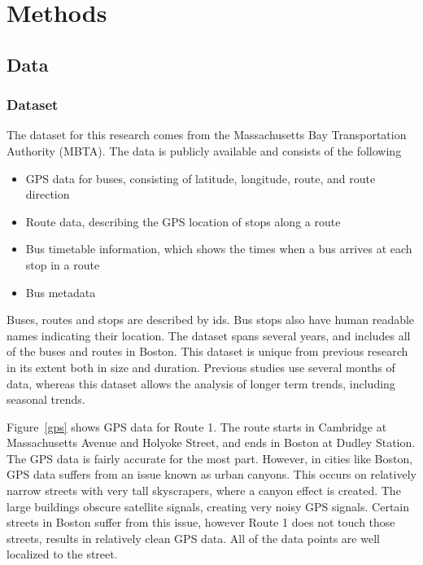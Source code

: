 \chapter{Methods}
\section{Data}\label{data}

\subsection{Dataset}

The dataset for this research comes from the Massachusetts Bay Transportation Authority (MBTA).  The data is publicly available and consists of the following

\begin{itemize}
  \item GPS data for buses, consisting of latitude, longitude, route, and route direction
  \item Route data, describing the GPS location of stops along a route
  \item Bus timetable information, which shows the times when a bus arrives at each stop in a route
  \item Bus metadata
\end{itemize}

Buses, routes and stops are described by ids.  Bus stops also have human readable names indicating their location.
The dataset spans several years, and includes all of the buses and routes in Boston.
This dataset is unique from previous research in its extent both in size and duration.
Previous studies use several months of data, whereas this dataset allows the analysis of longer term trends, including seasonal trends.

Figure~\ref{gps} shows GPS data for Route 1.  The route starts in Cambridge at Massachusetts Avenue and Holyoke Street, and ends in Boston at Dudley Station.
The GPS data is fairly accurate for the most part.
However, in cities like Boston, GPS data suffers from an issue known as urban canyons.
This occurs on relatively narrow streets with very tall skyscrapers, where a canyon effect is created.
The large buildings obscure satellite signals, creating very noisy GPS signals.
Certain streets in Boston suffer from this issue, however Route 1 does not touch those streets, results in relatively clean GPS data.
All of the data points are well localized to the street.


